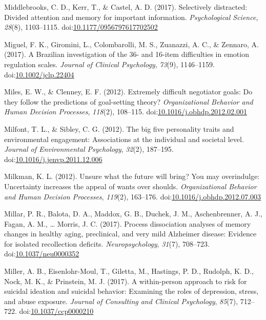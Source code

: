 \documentclass[english,man]{apa6}
\theoremstyle{definition}
\theoremstyle{definition}
\theoremstyle{definition}
\theoremstyle{remark}
\begin{document}
\hypertarget{ref-Middlebrooks2017}{}
Middlebrooks, C. D., Kerr, T., \& Castel, A. D. (2017). Selectively
distracted: Divided attention and memory for important information.
\emph{Psychological Science}, \emph{28}(8), 1103--1115.
doi:\href{https://doi.org/10.1177/0956797617702502}{10.1177/0956797617702502}

\hypertarget{ref-Miguel2017}{}
Miguel, F. K., Giromini, L., Colombarolli, M. S., Zuanazzi, A. C., \&
Zennaro, A. (2017). A Brazilian investigation of the 36- and 16-item
difficulties in emotion regulation scales. \emph{Journal of Clinical
Psychology}, \emph{73}(9), 1146--1159.
doi:\href{https://doi.org/10.1002/jclp.22404}{10.1002/jclp.22404}

\hypertarget{ref-Miles2012}{}
Miles, E. W., \& Clenney, E. F. (2012). Extremely difficult negotiator
goals: Do they follow the predictions of goal-setting theory?
\emph{Organizational Behavior and Human Decision Processes},
\emph{118}(2), 108--115.
doi:\href{https://doi.org/10.1016/j.obhdp.2012.02.001}{10.1016/j.obhdp.2012.02.001}

\hypertarget{ref-Milfont2012}{}
Milfont, T. L., \& Sibley, C. G. (2012). The big five personality traits
and environmental engagement: Associations at the individual and
societal level. \emph{Journal of Environmental Psychology},
\emph{32}(2), 187--195.
doi:\href{https://doi.org/10.1016/j.jenvp.2011.12.006}{10.1016/j.jenvp.2011.12.006}

\hypertarget{ref-Milkman2012}{}
Milkman, K. L. (2012). Unsure what the future will bring? You may
overindulge: Uncertainty increases the appeal of wants over shoulds.
\emph{Organizational Behavior and Human Decision Processes},
\emph{119}(2), 163--176.
doi:\href{https://doi.org/10.1016/j.obhdp.2012.07.003}{10.1016/j.obhdp.2012.07.003}

\hypertarget{ref-Millar2017}{}
Millar, P. R., Balota, D. A., Maddox, G. B., Duchek, J. M.,
Aschenbrenner, A. J., Fagan, A. M., \ldots{} Morris, J. C. (2017).
Process dissociation analyses of memory changes in healthy aging,
preclinical, and very mild Alzheimer disease: Evidence for isolated
recollection deficits. \emph{Neuropsychology}, \emph{31}(7), 708--723.
doi:\href{https://doi.org/10.1037/neu0000352}{10.1037/neu0000352}

\hypertarget{ref-Miller2017}{}
Miller, A. B., Eisenlohr-Moul, T., Giletta, M., Hastings, P. D.,
Rudolph, K. D., Nock, M. K., \& Prinstein, M. J. (2017). A within-person
approach to risk for suicidal ideation and suicidal behavior: Examining
the roles of depression, stress, and abuse exposure. \emph{Journal of
Consulting and Clinical Psychology}, \emph{85}(7), 712--722.
doi:\href{https://doi.org/10.1037/ccp0000210}{10.1037/ccp0000210}
\end{document}
